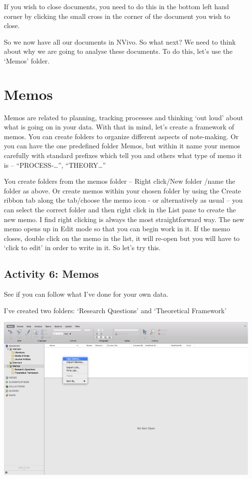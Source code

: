 \documentclass[]{book}
\theoremstyle{definition}
\theoremstyle{definition}
\theoremstyle{definition}
\theoremstyle{remark}
\begin{document}
If you wish to close documents, you need to do this in the bottom left
hand corner by clicking the small cross in the corner of the document
you wish to close.

So we now have all our documents in NVivo. So what next? We need to
think about why we are going to analyse these documents. To do this,
let's use the `Memos' folder.

\hypertarget{memos-1}{%
\section{Memos}\label{memos-1}}

Memos are related to planning, tracking processes and thinking `out
loud' about what is going on in your data. With that in mind, let's
create a framework of memos. You can create folders to organize
different aspects of note-making. Or you can have the one predefined
folder Memos, but within it name your memos carefully with standard
prefixes which tell you and others what type of memo it is --
``PROCESS-\ldots{}'', ``THEORY\ldots{}''

You create folders from the memos folder -- Right click/New folder /name
the folder as above. Or create memos within your chosen folder by using
the Create ribbon tab along the tab/choose the memo icon - or
alternatively as usual -- you can select the correct folder and then
right click in the List pane to create the new memo. I find right
clicking is always the most straightforward way. The new memo opens up
in Edit mode so that you can begin work in it. If the memo closes,
double click on the memo in the list, it will re-open but you will have
to `click to edit' in order to write in it. So let's try this.

\hypertarget{activity-6-memos}{%
\subsection{Activity 6: Memos}\label{activity-6-memos}}

See if you can follow what I've done for your own data.

I've created two folders: `Research Questions' and `Theoretical
Framework'

\includegraphics{imgs/qual_18.png}
\end{document}
